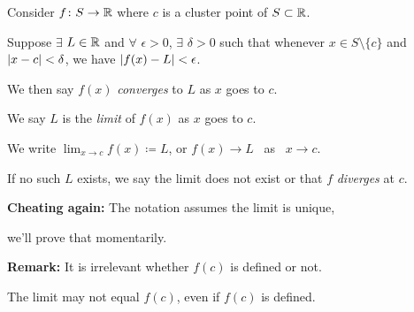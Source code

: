 \documentclass[10pt,aspectratio=149]{beamer}
\begin{document}
\begin{frame}

\begin{definition}
Consider $f \colon S \to {\mathbb{R}}$ where $c$ is a cluster point of $S \subset {\mathbb{R}}$.

\pause
\medskip

Suppose $\exists$ $L \in {\mathbb{R}}$ and $\forall$ $\epsilon > 0$,
$\exists$ $\delta > 0$ such that whenever $x \in S \setminus \{ c \}$
and $\left\lvert {x - c} \right\rvert < \delta$, we have
\quad
$\left\lvert {f(x) - L} \right\rvert < \epsilon$.

\pause
\medskip

We then say $f(x)$ \emph{converges} to $L$ as $x$ goes
to $c$.

\pause
We say $L$ is the \emph{limit} of $f(x)$ as $x$ goes to $c$.

\pause
\medskip

We write \quad
$\displaystyle
\lim_{x \to c} f(x) \coloneqq L$, \quad
or \quad
$f(x) \to L$ ~as~ $x \to c$.

\pause
\medskip

If no such $L$ exists, we say the limit does not exist or
that $f$ \emph{diverges} at $c$.
\end{definition}

\pause
\textbf{Cheating again:} The notation assumes the limit is unique,

we'll prove that momentarily.

\pause
\medskip

\textbf{Remark:} It is irrelevant whether $f(c)$ is defined or not.

\pause
The limit may not equal $f(c)$, even if $f(c)$ is defined.
\end{frame}
\end{document}
